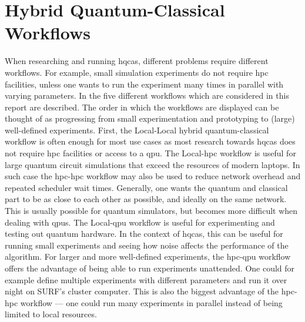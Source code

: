 \section{Hybrid Quantum-Classical Workflows}
When researching and running \glspl{hqca}, different problems require different workflows.
For example, small simulation experiments do not require \gls{hpc} facilities, unless one wants to run the experiment many times in parallel with varying parameters.
In  the five different workflows which are considered in this report are described.
The order in which the workflows are displayed can be thought of as progressing from small experimentation and prototyping to (large) well-defined experiments.
First, the Local-Local hybrid quantum-classical workflow is often enough for most use cases as most research towards \glspl{hqca} does not require \gls{hpc} facilities or access to a \gls{qpu}.
The Local-\gls{hpc} workflow is useful for large quantum circuit simulations that exceed the resources of modern laptops.
In such case the \gls{hpc}-\gls{hpc} workflow may also be used to reduce network overhead and repeated scheduler wait times.
Generally, one wants the quantum and classical part to be as close to each other as possible, and ideally on the same network.
This is usually possible for quantum simulators, but becomes more difficult when dealing with \glspl{qpu}.
The Local-\gls{qpu} workflow is useful for experimenting and testing out quantum hardware.
In the context of \glspl{hqca}, this can be useful for running small experiments and seeing how noise affects the performance of the algorithm.
For larger and more well-defined experiments, the \gls{hpc}-\gls{qpu} workflow offers the advantage of being able to run experiments unattended.
One could for example define multiple experiments with different parameters and run it over night on SURF's cluster computer.
This is also the biggest advantage of the \gls{hpc}-\gls{hpc} workflow --- one could run many experiments in parallel instead of being limited to local resources.

